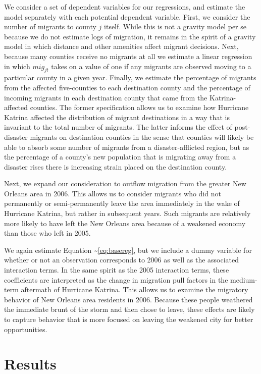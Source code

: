 \documentclass[]{article}
\begin{document}
We consider a set of dependent variables for our regressions, and
estimate the model separately with each potential dependent variable.
First, we consider the number of migrants to county \(j\) itself. While
this is not a gravity model per se because we do not estimate logs of
migration, it remains in the spirit of a gravity model in which distance
and other amenities affect migrant decisions. Next, because many
counties receive no migrants at all we estimate a linear regression in
which \(mig_{jt}\) takes on a value of one if any migrants are observed
moving to a particular county in a given year. Finally, we estimate the
percentage of migrants from the affected five-counties to each
destination county and the percentage of incoming migrants in each
destination county that came from the Katrina-affected counties. The
former specification allows us to examine how Hurricane Katrina affected
the distribution of migrant destinations in a way that is invariant to
the total number of migrants. The latter informs the effect of
post-disaster migrants on destination counties in the sense that
counties will likely be able to absorb some number of migrants from a
disaster-afflicted region, but as the percentage of a county's new
population that is migrating away from a disaster rises there is
increasing strain placed on the destination county.

Next, we expand our consideration to outflow migration from the greater
New Orleans area in 2006. This allows us to consider migrants who did
not permanently or semi-permanently leave the area immediately in the
wake of Hurricane Katrina, but rather in subsequent years. Such migrants
are relatively more likely to have left the New Orleans area because of
a weakened economy than those who left in 2005.

We again estimate Equation \textasciitilde{}\ref{eq:basereg}, but we
include a dummy variable for whether or not an observation corresponds
to 2006 as well as the associated interaction terms. In the same spirit
as the 2005 interaction terms, these coefficients are interpreted as the
change in migration pull factors in the medium-term aftermath of
Hurricane Katrina. This allows us to examine the migratory behavior of
New Orleans area residents in 2006. Because these people weathered the
immediate brunt of the storm and then chose to leave, these effects are
likely to capture behavior that is more focused on leaving the weakened
city for better opportunities.

\section{\texorpdfstring{Results
\label{sec:results}}{Results }}\label{results}
\end{document}
